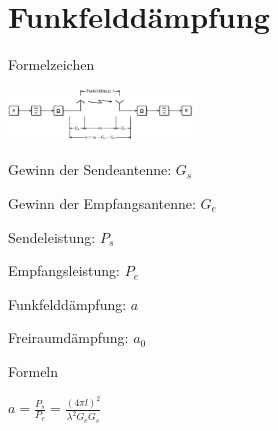 \documentclass[german]{latex4ei/latex4ei_sheet}
\begin{document}
    \section{Funkfelddämpfung}
    \begin{sectionbox}
        \begin{symbolbox}{Formelzeichen}
            \item \includegraphics[width=185px]{img/Funkuebertragungssystem.png}
            \item Gewinn der Sendeantenne: $G_s$
            \item Gewinn der Empfangsantenne: $G_e$
            \item Sendeleistung: $P_s$
            \item Empfangsleistung: $P_e$
            \item Funkfelddämpfung: $a$
            \item Freiraumdämpfung: $a_0$
        \end{symbolbox}
        
        \begin{bluebox}{Formeln}
            \item $a = \frac{P_s}{P_e} = \frac{(4\pi l)^2}{\lambda^2 G_e G_s}$

        \end{bluebox}
    \end{sectionbox}
\end{document}
